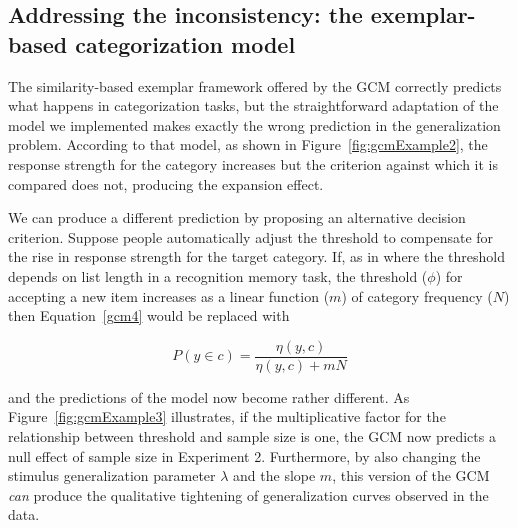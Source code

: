 \documentclass[doc,apacite]{apa6}
\begin{document}

\subsection{Addressing the inconsistency: the exemplar-based categorization model}

The similarity-based exemplar framework offered by the GCM correctly predicts what happens in categorization tasks, but the straightforward adaptation of the model we implemented makes exactly the wrong prediction in the generalization problem. According to that model, as shown in Figure~\ref{fig:gcmExample2}, the response strength for the category increases but the criterion against which it is compared does not, producing the expansion effect.

We can produce a different prediction by proposing an alternative decision criterion. Suppose people automatically adjust the threshold to compensate for the rise in response strength for the target category. If, as in  where the threshold depends on list length in a recognition memory task, the threshold ($\phi$) for accepting a new item increases as a linear function ($m$) of category frequency ($N$) then Equation~\ref{gcm4} would be replaced with

\begin{equation}
\label{gcm5}
P(y \in c) = \frac{\eta(y,c)}{\eta(y,c) + mN} 
\end{equation}

\noindent
and the predictions of the model now become rather different. As Figure~\ref{fig:gcmExample3} illustrates, if the multiplicative factor for the relationship between threshold and sample size is one, the GCM now predicts a null effect of sample size in Experiment 2. Furthermore, by also changing the stimulus generalization parameter $\lambda$ and the slope $m$, this version of the GCM {\it can} produce the qualitative tightening of generalization curves observed in the data.

\end{document}
